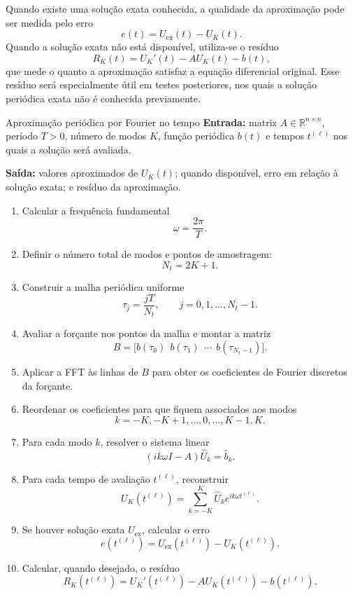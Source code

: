 Quando existe uma solução exata conhecida, a qualidade da aproximação pode ser medida pelo erro
\[
e(t)=U_{\mathrm{ex}}(t)-U_K(t).
\]
Quando a solução exata não está disponível, utiliza-se o resíduo
\[
R_K(t)=U_K'(t)-AU_K(t)-b(t),
\]
que mede o quanto a aproximação satisfaz a equação diferencial original. Esse resíduo será especialmente útil em testes posteriores, nos quais a solução periódica exata não é conhecida previamente.

\clearpage
\begin{algoritmo}{Aproximação periódica por Fourier no tempo}
\label{alg:fourier-tempo}
\textbf{Entrada:} matriz \(A\in\mathbb{R}^{n\times n}\), período \(T>0\), número de modos \(K\), função periódica \(b(t)\) e tempos \(t^{(\ell)}\) nos quais a solução será avaliada.

\textbf{Saída:} valores aproximados de \(U_K(t)\); quando disponível, erro em relação à solução exata; e resíduo da aproximação.

\begin{enumerate}[label=\textbf{Passo \arabic*.}, leftmargin=2.1cm]
    \item Calcular a frequência fundamental
    \[
    \omega=\frac{2\pi}{T}.
    \]

    \item Definir o número total de modos e pontos de amostragem:
    \[
    N_t=2K+1.
    \]

    \item Construir a malha periódica uniforme
    \[
    \tau_j=\frac{jT}{N_t},\qquad j=0,1,\ldots,N_t-1.
    \]

    \item Avaliar a forçante nos pontos da malha e montar a matriz
    \[
    B=\bigl[b(\tau_0)\ \ b(\tau_1)\ \ \cdots\ \ b(\tau_{N_t-1})\bigr].
    \]

    \item Aplicar a FFT às linhas de \(B\) para obter os coeficientes de Fourier discretos da forçante.

    \item Reordenar os coeficientes para que fiquem associados aos modos
    \[
    k=-K,-K+1,\ldots,0,\ldots,K-1,K.
    \]

    \item Para cada modo \(k\), resolver o sistema linear
    \[
    (ik\omega I-A)\widehat{U}_k=\widehat{b}_k.
    \]

    \item Para cada tempo de avaliação \(t^{(\ell)}\), reconstruir
    \[
    U_K(t^{(\ell)})=\sum_{k=-K}^{K}\widehat{U}_k e^{ik\omega t^{(\ell)}}.
    \]

    \item Se houver solução exata \(U_{\mathrm{ex}}\), calcular o erro
    \[
    e(t^{(\ell)})=U_{\mathrm{ex}}(t^{(\ell)})-U_K(t^{(\ell)}).
    \]

    \item Calcular, quando desejado, o resíduo
    \[
    R_K(t^{(\ell)})=U_K'(t^{(\ell)})-AU_K(t^{(\ell)})-b(t^{(\ell)}).
    \]
\end{enumerate}
\end{algoritmo}

